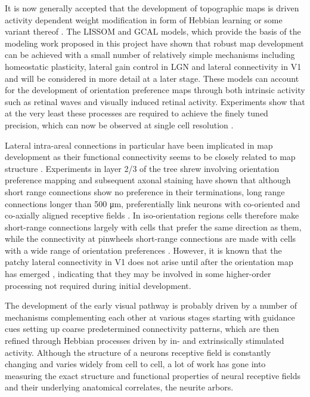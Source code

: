 It is now generally accepted that the development of topographic maps
is driven activity dependent weight modification in form of Hebbian
learning or some variant thereof \citep{Wolf}. The LISSOM and
GCAL models, which provide the basis of the modeling work proposed in
this project have shown that robust map development can be achieved
with a small number of relatively simple mechanisms including
homeostatic plasticity, lateral gain control in LGN and lateral
connectivity in V1 \citep{Stevens2013} and will be considered in more
detail at a later stage. These models can account for the development
of orientation preference maps through both intrinsic activity such as
retinal waves \citep{Bednar2003} and visually induced retinal
activity. Experiments show that at the very least these processes are
required to achieve the finely tuned precision, which can now be
observed at single cell resolution \citep{Ohki2005,White2007}.

Lateral intra-areal connections in particular have been implicated in
map development as their functional connectivity seems to be closely
related to map structure \citep{Gilbert1983}. Experiments in layer 2/3
of the tree shrew involving orientation preference mapping and
subsequent axonal staining have shown that although short range
connections show no preference in their terminations, long range
connections longer than 500 \si{\micro\metre}, preferentially link
neurons with co-oriented and co-axially aligned receptive fields
\citep{Bosking1997}. In iso-orientation regions cells therefore make
short-range connections largely with cells that prefer the same
direction as them, while the connectivity at pinwheels short-range
connections are made with cells with a wide range of orientation
preferences \citep{Ohki2005}. However, it is known that the patchy
lateral connectivity in V1 does not arise until after the orientation
map has emerged \citep{Ruthazer1996}, indicating that they may be
involved in some higher-order processing not required during initial
development.

The development of the early visual pathway is probably driven by a
number of mechanisms complementing each other at various stages
starting with guidance cues setting up coarse predetermined
connectivity patterns, which are then refined through Hebbian
processes driven by in- and extrinsically stimulated
activity. Although the structure of a neurons receptive field is
constantly changing and varies widely from cell to cell, a lot of work
has gone into measuring the exact structure and functional properties
of neural receptive fields and their underlying anatomical correlates,
the neurite arbors.

